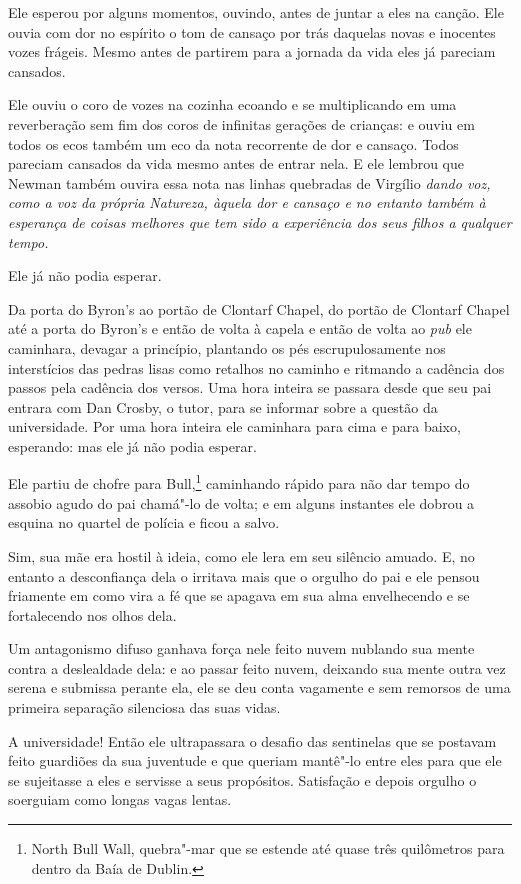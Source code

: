 Ele esperou por alguns momentos, ouvindo, antes de juntar a eles na
canção. Ele ouvia com dor no espírito o tom de cansaço por trás
daquelas novas e inocentes vozes frágeis. Mesmo antes de partirem para
a jornada da vida eles já pareciam cansados.

Ele ouviu o coro de vozes na cozinha ecoando e se multiplicando em uma
reverberação sem fim dos coros de infinitas gerações de crianças: e
ouviu em todos os ecos também um eco da nota recorrente de dor e
cansaço. Todos pareciam cansados da vida mesmo antes de entrar nela. E
ele lembrou que Newman também ouvira essa nota nas linhas quebradas de
Virgílio \textit{dando voz, como a voz da própria Natureza, àquela dor
e cansaço e no entanto também à esperança de coisas melhores que tem
sido a experiência dos seus filhos a qualquer tempo.}

\asterisc

Ele já não podia esperar.

Da porta do Byron’s ao portão de Clontarf Chapel, do portão de Clontarf
Chapel até a porta do Byron’s e então de volta à capela e então de
volta ao \textit{pub} ele caminhara, devagar a princípio, plantando os
pés escrupulosamente nos interstícios das pedras lisas como retalhos no
caminho e ritmando a cadência dos passos pela cadência dos versos. Uma
hora inteira se passara desde que seu pai entrara com Dan Crosby, o
tutor, para se informar sobre a questão da universidade. Por uma hora
inteira ele caminhara para cima e para baixo, esperando: mas ele já não
podia esperar.

Ele partiu de chofre para Bull,\footnote{ North Bull Wall, 
quebra"-mar que se estende até quase três quilômetros para dentro da Baía de
Dublin.} caminhando rápido para não dar tempo do assobio agudo do pai
chamá"-lo de volta; e em alguns instantes ele dobrou a esquina no
quartel de polícia e ficou a salvo.

Sim, sua mãe era hostil à ideia, como ele lera em seu silêncio amuado.
E, no entanto a desconfiança dela o irritava mais que o orgulho do pai
e ele pensou friamente em como vira a fé que se apagava em sua alma
envelhecendo e se fortalecendo nos olhos dela.

Um antagonismo difuso ganhava força nele feito nuvem nublando sua mente
contra a deslealdade dela: e ao passar feito nuvem, deixando sua mente
outra vez serena e submissa perante ela, ele se deu conta vagamente e
sem remorsos de uma primeira separação silenciosa das suas vidas.

A universidade! Então ele ultrapassara o desafio das sentinelas que se
postavam feito guardiões da sua juventude e que queriam mantê"-lo entre
eles para que ele se sujeitasse a eles e servisse a seus propósitos.
Satisfação e depois orgulho o soerguiam como longas vagas lentas.

